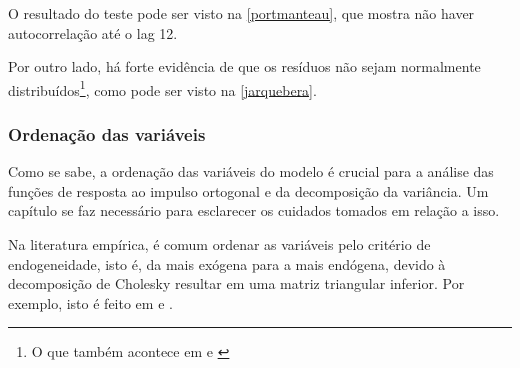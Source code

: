 \documentclass[a4paper,
               article,
               12pt,
               openany,
               oneside,
               english,
               brazil]{abntex2}
\numberwithin{equation}{section}
\begin{document}
    O resultado do teste pode ser visto na \autoref{portmanteau}, que mostra não haver autocorrelação até o lag 12.

    \begin{table}[!hbt]
    \end{table}

    Por outro lado, há forte evidência de que os resíduos não sejam normalmente distribuídos\footnote{O que também acontece em \textcite{chaim} e \textcite{oreiro}}, como pode ser visto na \autoref{jarquebera}.

    \begin{table}[!hbt]
    \end{table}

    \subsubsection{Ordenação das variáveis}

    Como se sabe, a ordenação das variáveis do modelo é crucial para a análise das funções de resposta ao impulso ortogonal e da decomposição da variância. Um capítulo se faz necessário para esclarecer os cuidados tomados em relação a isso.

    Na literatura empírica, é comum ordenar as variáveis pelo critério de endogeneidade, isto é, da mais exógena para a mais endógena, devido à decomposição de Cholesky resultar em uma matriz triangular inferior. Por exemplo, isto é feito em \textcite{oreiro} e \textcite{chaim}.
\end{document}

